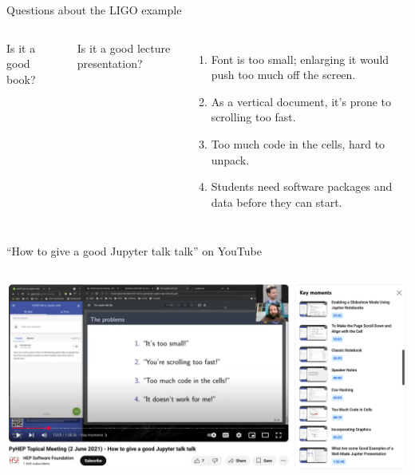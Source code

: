 \documentclass[aspectratio=169]{beamer}
\begin{document}
\begin{frame}{Questions about the LIGO example}
\Large
\vspace{0.5 cm}
\begin{columns}
Is it a good book?

\vspace{0.25 cm}

\vspace{1 cm}
Is it a good lecture presentation? 

\vspace{0.25 cm}
\begin{enumerate}
\item<4-> Font is too small; enlarging it would push too much off the screen.
\item<5-> As a vertical document, it's prone to scrolling too fast.
\item<6-> Too much code in the cells, hard to unpack.
\item<7-> Students need software packages and data before they can start.
\end{enumerate}
\end{columns}
\end{frame}

\begin{frame}{``How to give a good Jupyter talk talk'' on YouTube}
\vspace{0.5 cm}
\begin{columns}
\href{https://youtu.be/UhidS7fZZko?si=Vyr35fZhaSuyyxSW}{\includegraphics[width=\linewidth]{../img/jupyter-talk-talk.png}}
\end{columns}
\end{frame}
\end{document}
